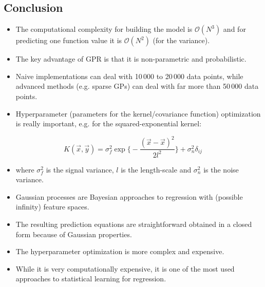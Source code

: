 		\subsection{Conclusion}
			\begin{itemize}
				\item The computational complexity for building the model is \( \mathcal{O}(N^3) \) and for predicting one function value it is \(\mathcal{O}(N^2)\) (for the variance).
				\item The key advantage of GPR is that it is non-parametric and probabilistic.
				\item Naive implementations can deal with 10\,000 to 20\,000 data points, while advanced methods (e.g. sparse GPs) can deal with far more than 50\,000 data points.
				\item Hyperparameter (parameters for the kernel/covariance function) optimization is really important, e.g. for the squared-exponential kernel:
			\end{itemize}
			\begin{equation}
				K(\vec{x}, \vec{y}) = \sigma_f^2 \exp \Bigg\{ -\frac{(\vec{x} - \vec{x})^2}{2l^2} \Bigg\} + \sigma_n^2 \delta_{ij}
			\end{equation}
			\begin{itemize}
				\item[] where \( \sigma_f^2 \) is the signal variance, \(l\) is the length-scale and \(\sigma_n^2\) is the noise variance.
				\item Gaussian processes are Bayesian approaches to regression with (possible infinity) feature spaces.
				\item The resulting prediction equations are straightforward obtained in a closed form because of Gaussian properties.
				\item The hyperparameter optimization is more complex and expensive.
				\item While it is very computationally expensive, it is one of the most used approaches to statistical learning for regression.
			\end{itemize}

